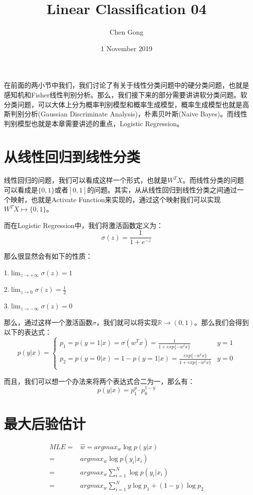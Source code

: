 \documentclass[a4paper]{article}
\title{Linear Classification 04}
\author{Chen Gong}
\date{1 November 2019}
\begin{document}
\maketitle
在前面的两小节中我们，我们讨论了有关于线性分类问题中的硬分类问题，也就是感知机和Fisher线性判别分析。那么，我们接下来的部分需要讲讲软分类问题。软分类问题，可以大体上分为概率判别模型和概率生成模型，概率生成模型也就是高斯判别分析(Gaussian Discriminate Analysis)，朴素贝叶斯(Naive Bayes)。而线性判别模型也就是本章需要讲述的重点，Logistic Regression。

\section{从线性回归到线性分类}
线性回归的问题，我们可以看成这样一个形式，也就是$W^TX$。而线性分类的问题可以看成是$\{0,1\}$或者$[0,1]$的问题。其实，从从线性回归到线性分类之间通过一个映射，也就是Activate Function来实现的，通过这个映射我们可以实现$W^TX \longmapsto \{0,1\}$。

而在Logistic Regression中，我们将激活函数定义为：
\begin{equation}
    \sigma(z)=\frac{1}{1+e^{-z}}
\end{equation}

那么很显然会有如下的性质：

1.$\lim_{z\longrightarrow+\infty} \sigma(z) = 1$ 

2.$\lim_{z\longrightarrow 0 } \sigma(z) = \frac{1}{2}$

3.$\lim_{z\longrightarrow-\infty} \sigma(z) = 0$

那么，通过这样一个激活函数$\sigma$，我们就可以将实现$\mathbb{R}\longrightarrow (0,1)$。那么我们会得到以下的表达式：
\begin{equation}
    p(y|x) = 
    \left\{
        \begin{array}{ll}
        p_1=p(y=1|x)=\sigma(w^Tx)=\frac{1}{1+exp\{-w^tx\}} & y=1 \\
        p_2=p(y=0|x)=1-p(y=1|x)=\frac{exp\{-w^tx\}}{1+exp\{-w^tx\}} & y=0 \\
    \end{array}
    \right.
\end{equation}

而且，我们可以想一个办法来将两个表达式合二为一，那么有：
\begin{equation}
    p(y|x) = p_1^y\cdot p_0^{1-y}  
\end{equation}

\section{最大后验估计}
\begin{equation}
    \begin{split}
        MLE = & \hat{w} = argmax_w \log p(y|x) \\
            = & argmax_w \log p(y_i|x_i) \\
            = & argmax_w \sum_{i=1}^N \log p(y_i|x_i) \\
            = & argmax_w \sum_{i=1}^N y\log p_1 + (1-y)\log p_2 \\
    \end{split}
\end{equation}
    
\end{document}
